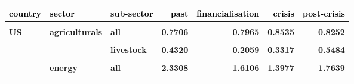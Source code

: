 \documentclass[
  authoryear,
  preprint,
  3p]{elsarticle}
\begin{document}
\begin{longtable}[t]{>{}l>{}l>{}l>{}r>{}r>{}r>{}r}
\toprule
\textcolor{black}{\textbf{country}} & \textcolor{black}{\textbf{sector}} & \textcolor{black}{\textbf{sub-sector}} & \textcolor{black}{\textbf{past}} & \textcolor{black}{\textbf{financialisation}} & \textcolor{black}{\textbf{crisis}} & \textcolor{black}{\textbf{post-crisis}}\\
\midrule
\textbf{\cellcolor{gray!10}{all}} & \textbf{\cellcolor{gray!10}{all}} & \textbf{\cellcolor{gray!10}{all}} & \textcolor[HTML]{4285f4}{\textbf{\cellcolor{gray!10}{0.8556}}} & \textcolor[HTML]{4285f4}{\textbf{\cellcolor{gray!10}{0.9709}}} & \textcolor[HTML]{4285f4}{\textbf{\cellcolor{gray!10}{1.0352}}} & \textcolor[HTML]{4285f4}{\textbf{\cellcolor{gray!10}{0.9438}}}\\
\textbf{US} & \textbf{agriculturals} & \textbf{all} & \textcolor[HTML]{4285f4}{\textbf{0.7706}} & \textcolor[HTML]{4285f4}{\textbf{0.7965}} & \textcolor[HTML]{4285f4}{\textbf{0.8535}} & \textcolor[HTML]{4285f4}{\textbf{0.8252}}\\
\textbf{\cellcolor{gray!10}{}} & \textbf{\cellcolor{gray!10}{}} & \textbf{\cellcolor{gray!10}{grains}} & \textcolor[HTML]{4285f4}{\textbf{\cellcolor{gray!10}{0.9891}}} & \textcolor[HTML]{4285f4}{\textbf{\cellcolor{gray!10}{1.1982}}} & \textcolor[HTML]{4285f4}{\textbf{\cellcolor{gray!10}{1.1727}}} & \textcolor[HTML]{4285f4}{\textbf{\cellcolor{gray!10}{1.0301}}}\\
\textbf{} & \textbf{} & \textbf{livestock} & \textcolor[HTML]{4285f4}{\textbf{0.4320}} & \textcolor[HTML]{4285f4}{\textbf{0.2059}} & \textcolor[HTML]{4285f4}{\textbf{0.3317}} & \textcolor[HTML]{4285f4}{\textbf{0.5484}}\\
\textbf{\cellcolor{gray!10}{}} & \textbf{\cellcolor{gray!10}{}} & \textbf{\cellcolor{gray!10}{softs}} & \textcolor[HTML]{4285f4}{\textbf{\cellcolor{gray!10}{0.7213}}} & \textcolor[HTML]{4285f4}{\textbf{\cellcolor{gray!10}{0.6900}}} & \textcolor[HTML]{4285f4}{\textbf{\cellcolor{gray!10}{0.7953}}} & \textcolor[HTML]{4285f4}{\textbf{\cellcolor{gray!10}{0.7589}}}\\
\addlinespace
\textbf{} & \textbf{energy} & \textbf{all} & \textcolor[HTML]{4285f4}{\textbf{2.3308}} & \textcolor[HTML]{4285f4}{\textbf{1.6106}} & \textcolor[HTML]{4285f4}{\textbf{1.3977}} & \textcolor[HTML]{4285f4}{\textbf{1.7639}}\\
\textbf{\cellcolor{gray!10}{}} & \textbf{\cellcolor{gray!10}{}} & \textbf{\cellcolor{gray!10}{gas}} & \textcolor[HTML]{4285f4}{\textbf{\cellcolor{gray!10}{2.6992}}} & \textcolor[HTML]{4285f4}{\textbf{\cellcolor{gray!10}{1.7090}}} & \textcolor[HTML]{4285f4}{\textbf{\cellcolor{gray!10}{1.0044}}} & \textcolor[HTML]{4285f4}{\textbf{\cellcolor{gray!10}{1.2585}}}\\

\end{longtable}
\end{document}
